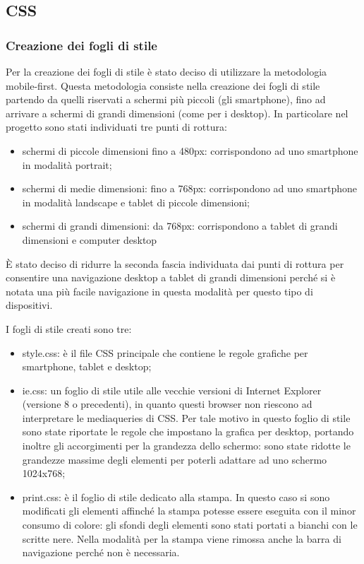 \subsection{CSS}
\subsubsection{Creazione dei fogli di stile}

Per la creazione dei fogli di stile è stato deciso di utilizzare la metodologia mobile-first.
Questa metodologia consiste nella creazione dei fogli di stile partendo da quelli riservati a schermi più piccoli (gli smartphone), fino ad arrivare a schermi di grandi dimensioni (come per i desktop).
In particolare nel progetto sono stati individuati tre punti di rottura:
\begin{itemize}

    \item schermi di piccole dimensioni fino a 480px: corrispondono ad uno smartphone in modalità portrait;
    \item schermi di medie dimensioni: fino a 768px: corrispondono ad uno smartphone in modalità landscape e tablet di piccole dimensioni;
    \item schermi di grandi dimensioni: da 768px: corrispondono a tablet di grandi dimensioni e computer desktop

\end{itemize}

\`E stato deciso di ridurre la seconda fascia individuata dai punti di rottura per consentire una navigazione desktop a tablet di grandi dimensioni perché si è notata una più facile navigazione in questa modalità per questo tipo di dispositivi.

I fogli di stile creati sono tre:
\begin{itemize}

    \item style.css: è il file CSS principale che contiene le regole grafiche per smartphone, tablet e desktop;
    \item ie.css:  un foglio di stile utile alle vecchie versioni di Internet Explorer (versione 8 o precedenti), in quanto questi browser non riescono ad interpretare le mediaqueries di CSS. Per tale motivo in questo foglio di stile sono state riportate le regole che impostano la grafica per desktop, portando inoltre gli accorgimenti per la grandezza dello schermo: sono state ridotte le grandezze massime degli elementi per poterli adattare ad uno schermo 1024x768;
    \item print.css: è il foglio di stile dedicato alla stampa. In questo caso si sono modificati gli elementi affinché la stampa potesse essere eseguita con il minor consumo di colore: gli sfondi degli elementi sono stati portati a bianchi con le scritte nere. Nella modalità per la stampa viene rimossa anche la barra di navigazione perché non è necessaria.

\end{itemize}


